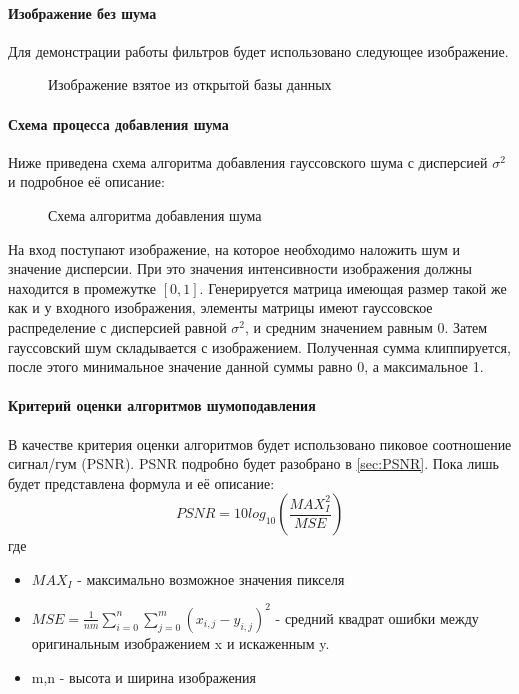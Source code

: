 \paragraph{Изображение без шума}
Для демонстрации работы фильтров будет использовано следующее изображение.
\begin{figure}[H]
	\caption{Изображение взятое из открытой базы данных \cite{imageNet}}
	\label{img:orig}
\end{figure}
\paragraph{Схема процесса добавления шума}
Ниже приведена схема алгоритма добавления гауссовского шума с дисперсией $\sigma^2$ и подробное её описание:
\begin{figure}[H]
	\caption{Схема алгоритма добавления шума}
\end{figure}

На вход поступают изображение,  на которое необходимо наложить шум и значение дисперсии. При это значения интенсивности изображения  должны находится в промежутке $[0,1]$. Генерируется матрица имеющая размер такой же как и у входного изображения, элементы матрицы имеют гауссовское распределение с дисперсией равной $\sigma^2$, и средним значением равным 0. Затем гауссовский шум складывается с изображением. Полученная сумма клиппируется, после этого минимальное значение данной суммы равно 0, а максимальное 1.
\paragraph{Критерий оценки алгоритмов шумоподавления}
В качестве критерия оценки алгоритмов будет использовано пиковое соотношение сигнал/гум (PSNR). PSNR подробно будет разобрано в \ref{sec:PSNR}. Пока лишь будет представлена формула и её описание:
\begin{equation}
PSNR = 10log_{10}(\frac{MAX_I^2}{MSE})
\end{equation}
где 
\begin{itemize}
	\item $MAX_I$ - максимально возможное значения пикселя
	\item $MSE = \frac{1}{nm}\sum_{i=0}^{n}\sum_{j=0}^{m}(x_{i,j} - y_{i,j})^2$ - средний квадрат ошибки между оригинальным изображением x и искаженным y.
	\item m,n - высота и ширина изображения
\end{itemize}
